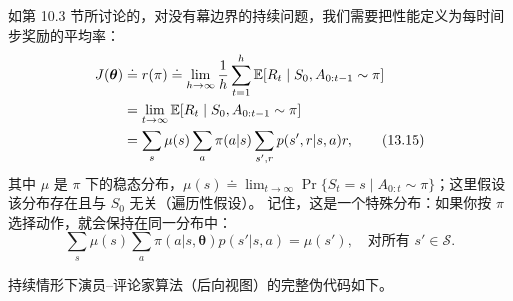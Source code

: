 \documentclass[UTF8,12pt,a4paper,fontset=fandol]{ctexart}
\begin{document}
如第 10.3 节所讨论的，对没有幕边界的持续问题，我们需要把性能定义为每时间步奖励的平均率：
\begin{align}
J(\boldsymbol{\theta})
&\doteq r(\pi)\doteq \lim_{h\to\infty}\frac{1}{h}\sum_{t=1}^{h}\mathbb{E}[R_t\mid S_0,A_{0:t-1}\sim\pi]\notag\\
&=\lim_{t\to\infty}\mathbb{E}[R_t\mid S_0,A_{0:t-1}\sim\pi]\notag\\
&=\sum_s\mu(s)\sum_a\pi(a|s)\sum_{s',r}p(s',r|s,a)r,
\tag{13.15}
\end{align}
其中 $\mu$ 是 $\pi$ 下的稳态分布，$\mu(s)\doteq \lim_{t\to\infty}\Pr\{S_t=s\mid A_{0:t}\sim\pi\}$；这里假设该分布存在且与 $S_0$ 无关（遍历性假设）。
记住，这是一个特殊分布：如果你按 $\pi$ 选择动作，就会保持在同一分布中：
\begin{equation}
\sum_s\mu(s)\sum_a\pi(a|s,\boldsymbol{\theta})p(s'|s,a)=\mu(s'),\quad \text{对所有 }s'\in\mathcal{S}.
\tag{13.16}
\end{equation}

持续情形下演员--评论家算法（后向视图）的完整伪代码如下。
\end{document}
